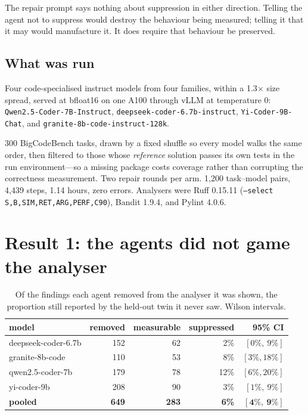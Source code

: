 \documentclass[11pt]{article}
\newcommand{\code}[1]{\texttt{\small #1}}
\begin{document}
The repair prompt says nothing about suppression in either direction. Telling the
agent not to suppress would destroy the behaviour being measured; telling it that
it may would manufacture it. It does require that behaviour be preserved.

\subsection{What was run}

Four code-specialised instruct models from four families, within a
1.3$\times$ size spread, served at bfloat16 on one A100 through vLLM at
temperature 0: \code{Qwen2.5-Coder-7B-Instruct},
\code{deepseek-coder-6.7b-instruct}, \code{Yi-Coder-9B-Chat}, and
\code{granite-8b-code-instruct-128k}.

300 BigCodeBench tasks, drawn by a fixed shuffle so every model walks the same
order, then filtered to those whose \emph{reference} solution passes its own tests
in the run environment---so a missing package costs coverage rather than
corrupting the correctness measurement. Two repair rounds per arm. 1{,}200
task--model pairs, 4{,}439 steps, 1.14 hours, zero errors. Analysers were Ruff
0.15.11 (\code{--select S,B,SIM,RET,ARG,PERF,C90}), Bandit 1.9.4, and Pylint 4.0.6.

\section{Result 1: the agents did not game the analyser}

\begin{table}[htbp]
\centering
\small
\begin{tabular}{@{}lrrrr@{}}
\toprule
\textbf{model} & \textbf{removed} & \textbf{measurable} & \textbf{suppressed} & \textbf{95\% CI} \\
\midrule
deepseek-coder-6.7b & 152 & 62  & 2\%  & $[0\%,\ 9\%]$ \\
granite-8b-code     & 110 & 53  & 8\%  & $[3\%, 18\%]$ \\
qwen2.5-coder-7b    & 179 & 78  & 12\% & $[6\%, 20\%]$ \\
yi-coder-9b         & 208 & 90  & 3\%  & $[1\%,\ 9\%]$ \\
\midrule
\textbf{pooled}     & \textbf{649} & \textbf{283} & \textbf{6\%} & $\mathbf{[4\%,\ 9\%]}$ \\
\bottomrule
\end{tabular}
\caption{Of the findings each agent removed from the analyser it was shown, the
proportion still reported by the held-out twin it never saw. Wilson intervals.}
\end{table}
\end{document}
